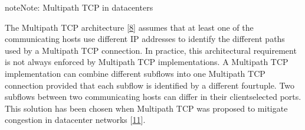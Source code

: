 \documentclass[letterpaper,10pt,english]{sphinxmanual}
\begin{document}
\begin{sphinxadmonition}{note}{Note:}
\sphinxAtStartPar
Multipath TCP in datacenters

\sphinxAtStartPar
The Multipath TCP architecture {[}\hyperlink{cite.biblio:id6033}{8}{]} assumes that at least one of the communicating hosts use different IP addresses to identify the different paths used by a Multipath TCP connection. In practice, this architectural requirement is not always enforced by Multipath TCP implementations. A Multipath TCP implementation can combine different subflows into one Multipath TCP connection provided that each subflow is identified by a different four\sphinxhyphen{}tuple. Two subflows between two communicating hosts can differ in their client\sphinxhyphen{}selected ports. This solution has been chosen when Multipath TCP was proposed to mitigate congestion in datacenter networks {[}\hyperlink{cite.biblio:id8933}{11}{]}.


\end{sphinxadmonition}
\end{document}
